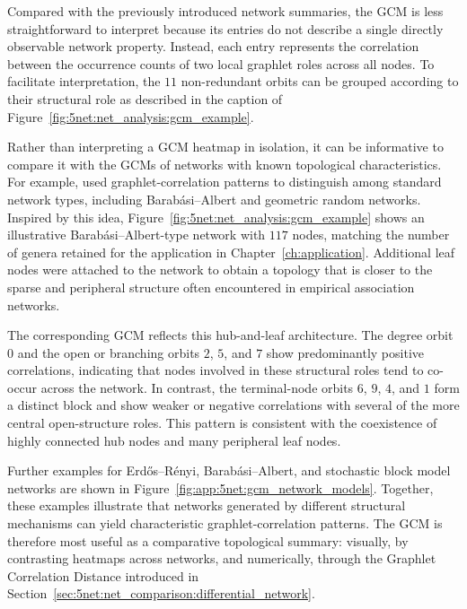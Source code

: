 Compared with the previously introduced network summaries, the GCM is less straightforward to interpret because its entries do not describe a single directly observable network property. Instead, each entry represents the correlation between the occurrence counts of two local graphlet roles across all nodes. To facilitate interpretation, the $11$ non-redundant orbits can be grouped according to their structural role as described in the caption of Figure~\ref{fig:5net:net_analysis:gcm_example}.

Rather than interpreting a GCM heatmap in isolation, it can be informative to compare it with the GCMs of networks with known topological characteristics. For example, \citet{yaveroglu2014revealing} used graphlet-correlation patterns to distinguish among standard network types, including Barab\'asi--Albert and geometric random networks. Inspired by this idea, Figure~\ref{fig:5net:net_analysis:gcm_example} shows an illustrative Barab\'asi--Albert-type network with $117$ nodes, matching the number of genera retained for the application in Chapter~\ref{ch:application}. Additional leaf nodes were attached to the network to obtain a topology that is closer to the sparse and peripheral structure often encountered in empirical association networks.

The corresponding GCM reflects this hub-and-leaf architecture. The degree orbit~$0$ and the open or branching orbits $2$, $5$, and $7$ show predominantly positive correlations, indicating that nodes involved in these structural roles tend to co-occur across the network. In contrast, the terminal-node orbits $6$, $9$, $4$, and $1$ form a distinct block and show weaker or negative correlations with several of the more central open-structure roles. This pattern is consistent with the coexistence of highly connected hub nodes and many peripheral leaf nodes.

\newpage
Further examples for Erd\H{o}s--R\'enyi, Barab\'asi--Albert, and stochastic block model networks are shown in Figure~\ref{fig:app:5net:gcm_network_models}. Together, these examples illustrate that networks generated by different structural mechanisms can yield characteristic graphlet-correlation patterns. The GCM is therefore most useful as a comparative topological summary: visually, by contrasting heatmaps across networks, and numerically, through the Graphlet Correlation Distance introduced in Section~\ref{sec:5net:net_comparison:differential_network}.

